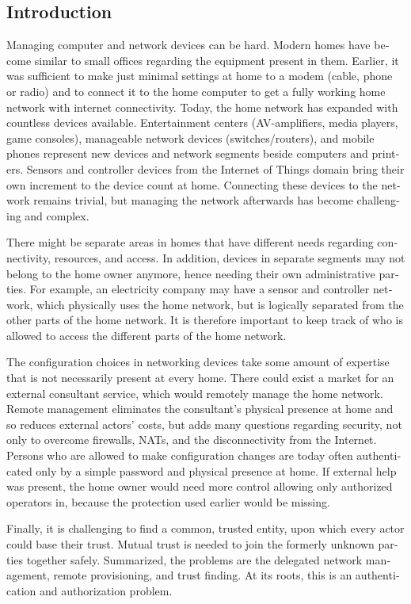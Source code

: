 \documentclass[12pt,a4paper,english]{tutthesis}
\begin{document}
\begin{otherlanguage}{english}
\chapter{Introduction}
\label{sec-1}
\label{cha:intro}


Managing computer and network devices can be hard.  Modern homes have
become similar to small offices regarding the equipment present in them.
Earlier, it was sufficient to make just minimal settings at home to a
modem (cable, phone or radio) and to connect it to the home computer to
get a fully working home network with internet connectivity.  Today,
the home
network has expanded with countless devices available. 
Entertainment centers (AV-amplifiers, media players, game consoles),
manageable network devices (switches/routers), and mobile phones
represent new devices and network segments beside computers and
printers. Sensors and controller devices from the Internet of Things
domain bring their own increment to the device count at home.
Connecting these devices to the network remains trivial, but managing the
network afterwards has become challenging and complex.

There might be separate areas in homes that have different needs regarding
connectivity, resources, and access. In addition, devices in
separate segments may not belong to the home owner anymore, hence needing
their own administrative parties. For example, an electricity company may
have a sensor and controller network, which physically uses the home network, but
is logically separated from the other parts of the home network. It is therefore
important to keep track of who is allowed to access the different parts of the
home network. 


The configuration choices in networking devices take some
amount of expertise that is not necessarily present at every
home. There could exist a market for an external consultant service, which would
remotely manage the home network.
Remote management eliminates the consultant's 
physical presence at home and so reduces external actors' costs, but adds many questions
regarding security, not only to overcome firewalls, NATs, and
the disconnectivity from the Internet.
Persons who are allowed to make configuration changes are today
often authenticated only by a simple password and physical presence at home.
If external help was present, the home owner would need more 
control allowing only authorized operators in, because the 
protection used earlier would be missing.

Finally, it is challenging to find a common, 
trusted entity, upon which every actor could base their trust.
Mutual trust
 is needed to join the formerly unknown parties together
safely. 
Summarized, the problems are the delegated network management, remote
provisioning, and trust finding. At its roots, this is an authentication
and authorization problem.









\end{otherlanguage}
\end{document}
